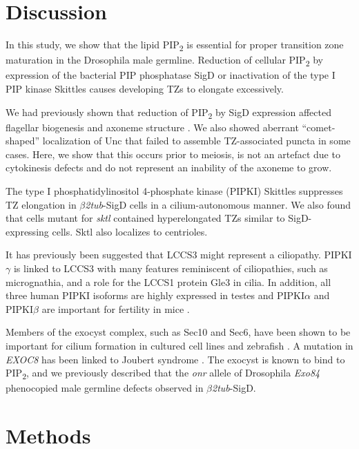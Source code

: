 \documentclass[12pt, twoside, letterpaper]{article}
\newcommand{\PIP}{PIP\textsubscript{2}}
\newcommand{\sigd}{$\beta$\textit{2tub}-SigD}
\begin{document}
\section{Discussion}

In this study, we show that the lipid \PIP{} is essential for proper
transition zone maturation in the Drosophila male germline.
Reduction of cellular \PIP{} by expression of the bacterial PIP
phosphatase SigD or inactivation of the type I PIP kinase Skittles
causes developing TZs to elongate excessively.

We had previously shown that reduction of \PIP{} by SigD expression
affected flagellar biogenesis and axoneme structure
\citep{wei2008depletion}.
We also showed aberrant ``comet-shaped'' localization of Unc that
failed to assemble TZ-associated puncta in some cases.
Here, we show that this occurs prior to meiosis,
is not an artefact due to cytokinesis defects
and do not represent an inability of the axoneme to grow.

The type I phosphatidylinositol 4-phosphate kinase (PIPKI) Skittles
suppresses TZ elongation in \sigd{} cells in a cilium-autonomous
manner.
We also found that cells mutant for \textit{sktl} contained hyperelongated
TZs similar to SigD-expressing cells.
Sktl also localizes to centrioles.

It has previously been suggested that LCCS3 might represent a ciliopathy.
PIPKI$\gamma$ is linked to LCCS3 with many features reminiscent
of ciliopathies, such as micrognathia, and a role for the LCCS1 protein
Gle3 in cilia.
In addition, all three human PIPKI isoforms are highly expressed in testes
and PIPKI$\alpha$ and PIPKI$\beta$ are important for fertility in mice
\citep{hasegawa2012phosphatidylinositol}.

Members of the exocyst complex, such as Sec10 and Sec6, have been shown
to be important for cilium formation in cultured cell lines and zebrafish
\citep{zuo2009exocyst, lobo2017exocyst, seixas2016arl13b}.
A mutation in \textit{EXOC8} has been linked
to Joubert syndrome \citep{dixon2012exome}.
The exocyst is known to bind to \PIP{}, and we previously described that
the \textit{onr} allele of Drosophila \textit{Exo84} phenocopied
male germline defects observed in \sigd{}.



\section{Methods}
\end{document}
